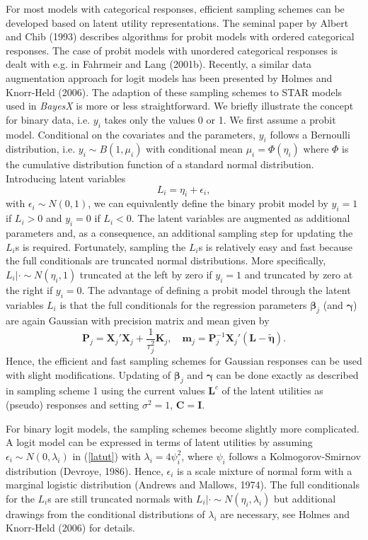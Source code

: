 \documentclass[11pt,a4paper,twoside]{bayesxarticle}
\def \Kvec {\vec{K}}
\def \Pvec {\vec{P}}
\def \betavec {\boldsymbol{\beta}}
\def \etavec {\boldsymbol{\eta}}
\def \gammavec {\boldsymbol{\gamma}}
\def \mvec {\mathbf{m}}
\def \Cvec {\mathbf{C}}
\def \Kvec {\mathbf{K}}
\def \Ivec {\mathbf{I}}
\def \Lvec {\mathbf{L}}
\def \Cvec {\mathbf{C}}
\def \Pvec {\mathbf{P}}
\def \Xvec {\mathbf{X}}
\begin{document}
For most models with categorical responses, efficient sampling
schemes can be developed based on latent utility representations.
The seminal paper by Albert and Chib (1993) describes algorithms for
probit models with ordered categorical responses. The case of probit
models with unordered categorical responses is dealt with e.g. in
Fahrmeir and Lang (2001b). Recently, a similar data augmentation
approach for logit models has been presented by Holmes and
Knorr-Held (2006). The adaption of these sampling schemes to STAR
models used in {\em BayesX} is more or less straightforward. We
briefly illustrate the concept for binary data, i.e. $y_i$ takes
only the values 0 or 1. We first assume a probit model. Conditional
on the covariates and the parameters, $y_i$ follows a Bernoulli
distribution, i.e. $y_i \sim B(1,\mu_i)$ with conditional mean
$\mu_i = \Phi(\eta_i)$ where $\Phi$ is the cumulative distribution
function of a standard normal distribution. Introducing latent
variables
\begin{equation}
\label{latut} L_i = \eta_i + \epsilon_i,
\end{equation}
with $\epsilon_i \sim N(0,1)$, we can equivalently define the binary
probit model by $y_i = 1$ if $L_i > 0$ and $y_i=0$ if $L_i < 0$. The
latent variables are augmented as additional parameters and, as a
consequence, an additional sampling step for updating the $L_i$s is
required. Fortunately, sampling the $L_i$s is relatively easy and
fast because the full conditionals are truncated normal
distributions. More specifically, $L_i | \cdot \sim N(\eta_i,1)$
truncated at the left by zero if $y_i=1$ and truncated by zero at
the right if $y_i=0$. The advantage of defining a probit model
through the latent variables $L_i$ is that the full conditionals for
the regression parameters $\betavec_j$ (and $\gammavec$) are again
Gaussian with precision matrix and mean given by
\begin{equation}
\label{prec2} \Pvec_j = \Xvec_j'\Xvec_j + \frac{1}{\tau^2_j}\Kvec_j, \quad \mvec_j =
\Pvec_j^{-1} \Xvec_j'(\Lvec-\tilde{\etavec}).
\end{equation}
Hence, the efficient and fast sampling schemes for Gaussian
responses can be used with slight modifications. Updating of
$\betavec_j$ and $\gammavec$ can be done exactly as described in
sampling scheme 1  using the current values $\Lvec^c$ of the latent
utilities as (pseudo) responses and setting $\sigma^2=1$, $\Cvec=\Ivec$.

For binary logit models, the sampling schemes become slightly more
complicated. A logit model can be expressed in terms of latent
utilities by assuming $\epsilon_i \sim N(0,\lambda_i)$ in
(\ref{latut}) with $\lambda_i = 4\psi_i^2$, where $\psi_i$ follows a
Kolmogorov-Smirnov distribution (Devroye, 1986). Hence, $\epsilon_i$
is  a scale mixture of normal form with a marginal logistic
distribution (Andrews and Mallows, 1974). The full conditionals for
the $L_i$s are still truncated normals with $L_i | \cdot \sim
N(\eta_i,\lambda_i)$ but additional drawings from the conditional
distributions of $\lambda_i$ are necessary, see Holmes and
Knorr-Held (2006) for details.
\end{document}
